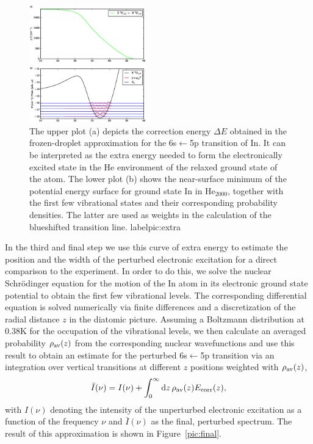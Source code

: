 \documentclass[twoside,twocolumn,9pt]{article}
\begin{document}
\begin{figure}[htbp!]
  	\begin{center}
 		\includegraphics[width=0.45\textwidth]{6.eps}
                \caption{The upper plot (a) depicts the correction energy $\Delta{}E$ obtained in the frozen-droplet approximation for the  6s$\leftarrow{}$5p transition of In. It can be interpreted as the extra energy needed to form the electronically excited state in the He environment of the relaxed ground state of the atom. The lower plot (b) shows the near-surface minimum of the potential energy surface for ground state In in He$_{2000}$, together with the first few vibrational states and their corresponding probability densities. The latter are used as weights in the calculation of the blueshifted transition line. label{pic:extra}}
  	\end{center}
\end{figure}

In the third and final step we use this curve of extra energy to estimate the position and the width of the perturbed electronic excitation for a direct comparison to the experiment. In order to do this, we solve the nuclear Schr\"odinger equation for the motion of the In atom in its electronic ground state potential to obtain the first few vibrational levels. The corresponding differential equation is solved numerically via finite differences and a discretization of the radial distance $z$ in the diatomic picture. Assuming a Boltzmann distribution at 0.38K\cite{standardpaper} for the occupation of the vibrational levels, we then calculate an averaged probability $\rho{}_{\rm av}(z)$ from the corresponding nuclear wavefunctions and use this result to obtain an estimate for the perturbed  6s$\leftarrow{}$5p transition via an integration over vertical transitions at different $z$ positions weighted with $\rho{}_{\rm av}(z)$,
\begin{equation}
\bar{I}(\nu) = I(\nu) +  \int_{0}^{\infty} \mathrm{d}z\,\rho{}_{\rm av}(z) E_{\rm corr}(z),
\end{equation}
with  $I(\nu)$ denoting the intensity of the unperturbed electronic excitation as a  function of the frequency $\nu$ and $\bar{I}(\nu)$ as the final, perturbed spectrum. The result of this approximation is shown in Figure~\ref{pic:final}.
\end{document}
